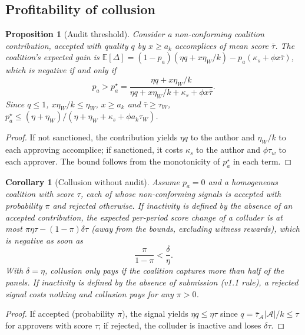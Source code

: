 \documentclass[11pt,a4paper]{article}
\theoremstyle{plain}
\newtheorem{proposition}{Proposition}
\newtheorem{corollary}{Corollary}
\theoremstyle{definition}
\theoremstyle{remark}
\newcommand{\1}{\mathbf{1}}
\newcommand{\E}{\mathbb{E}}
\begin{document}
\subsection{Profitability of collusion}

\begin{proposition}[Audit threshold]\label{prop:collusion}
Consider a non-conforming coalition contribution, accepted with quality $q$ by
$x\ge a_k$ accomplices of mean score $\bar\tau$. The coalition's expected gain
is $\E[\Delta]=(1-p_a)(\eta q+x\eta_W/k)-p_a(\kappa_s+\phi x\bar\tau)$, which is
negative if and only if
\begin{equation}
p_a>p^\star_a=\frac{\eta q+x\eta_W/k}{\eta q+x\eta_W/k+\kappa_s+\phi x\bar\tau}.
\label{eq:pa}
\end{equation}
Since $q\le1$, $x\eta_W/k\le\eta_W$, $x\ge a_k$ and $\bar\tau\ge\tau_W$,
$p^\star_a\le(\eta+\eta_W)/(\eta+\eta_W+\kappa_s+\phi a_k\tau_W)$.
\end{proposition}
\begin{proof}
If not sanctioned, the contribution yields $\eta q$ to the author and
$\eta_W/k$ to each approving accomplice; if sanctioned, it costs $\kappa_s$ to
the author and $\phi\tau_w$ to each approver. The bound follows from the
monotonicity of $p^\star_a$ in each term.
\end{proof}

\begin{corollary}[Collusion without audit]\label{cor:noaudit}
Assume $p_a=0$ and a homogeneous coalition with score $\tau$, each of whose
non-conforming signals is accepted with probability $\pi$ and rejected
otherwise. If inactivity is defined by the absence of an accepted contribution,
the expected per-period score change of a colluder is at most
$\pi\eta\tau-(1-\pi)\delta\tau$ (away from the bounds, excluding witness
rewards), which is negative as soon as
\begin{equation}
\frac{\pi}{1-\pi}<\frac{\delta}{\eta}.
\label{eq:noaudit}
\end{equation}
With $\delta=\eta$, collusion only pays if the coalition captures more than
half of the panels. If inactivity is defined by the absence of submission
(v1.1 rule), a rejected signal costs nothing and collusion pays for any
$\pi>0$.
\end{corollary}
\begin{proof}
If accepted (probability $\pi$), the signal yields $\eta q\le\eta\tau$ since
$q=\bar\tau_{\mathcal{A}}|\mathcal{A}|/k\le\tau$ for approvers with score
$\tau$; if rejected, the colluder is inactive and loses $\delta\tau$.
\end{proof}
\end{document}
